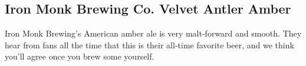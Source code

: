 \part{\styleamericanamberale}

\chapter*{Iron Monk Brewing Co. Velvet Antler Amber}

\begin{aboutblock}
Iron Monk Brewing's American amber ale is very malt-forward and smooth. They hear from
fans all the time that this is their all-time favorite beer, and we think you’ll agree
once you brew some yourself.
\end{aboutblock}


\begin{methodandtiming}
 
\begin{mashsteps}
\end{mashsteps}

\begin{fermentationsteps}
\end{fermentationsteps}

\end{methodandtiming}

\pagebreak

\begin{ingredientsblock}

\begin{malts}
\end{malts}

\begin{hops}
\end{hops}

\begin{yeasts}
\end{yeasts}

\end{ingredientsblock}
